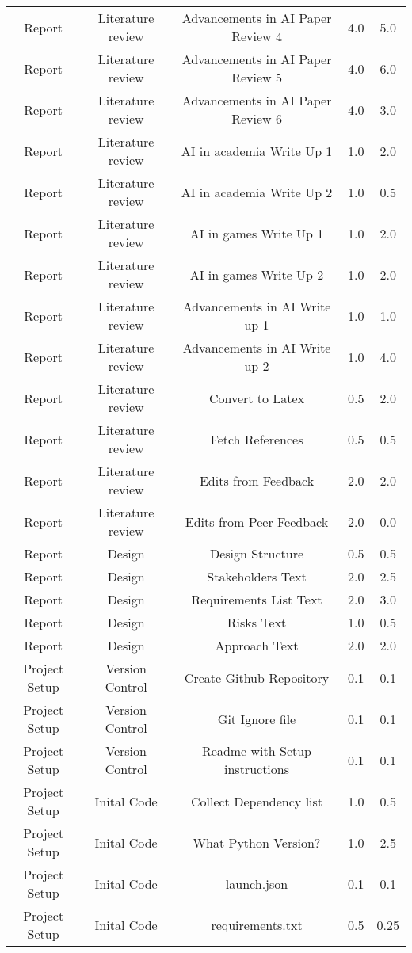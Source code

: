 \begin{longtable}{|c|c|c|c|c|}
	Report & Literature review & Advancements in AI Paper Review 4 & 4.0 & 5.0 \\
	Report & Literature review & Advancements in AI Paper Review 5 & 4.0 & 6.0 \\
	Report & Literature review & Advancements in AI Paper Review 6 & 4.0 & 3.0 \\
	Report & Literature review & AI in academia Write Up 1 & 1.0 & 2.0 \\
	Report & Literature review & AI in academia Write Up 2 & 1.0 & 0.5 \\
	Report & Literature review & AI in games Write Up 1 & 1.0 & 2.0 \\
	Report & Literature review & AI in games Write Up 2 & 1.0 & 2.0 \\
	Report & Literature review & Advancements in AI Write up 1 & 1.0 & 1.0 \\
	Report & Literature review & Advancements in AI Write up 2 & 1.0 & 4.0 \\
	Report & Literature review & Convert to Latex & 0.5 & 2.0 \\
	Report & Literature review & Fetch References & 0.5 & 0.5 \\
	Report & Literature review & Edits from Feedback & 2.0 & 2.0 \\
	Report & Literature review & Edits from Peer Feedback & 2.0 & 0.0 \\
	Report & Design & Design Structure & 0.5 & 0.5 \\
	Report & Design & Stakeholders Text & 2.0 & 2.5 \\
	Report & Design & Requirements List Text & 2.0 & 3.0 \\
	Report & Design & Risks Text & 1.0 & 0.5 \\
	Report & Design & Approach Text & 2.0 & 2.0 \\
	Project Setup & Version Control & Create Github Repository & 0.1 & 0.1 \\
	Project Setup & Version Control & Git Ignore file & 0.1 & 0.1 \\
	Project Setup & Version Control & Readme with Setup instructions & 0.1 & 0.1 \\
	Project Setup & Inital Code & Collect Dependency list & 1.0 & 0.5 \\
	Project Setup & Inital Code & What Python Version? & 1.0 & 2.5 \\
	Project Setup & Inital Code & launch.json & 0.1 & 0.1 \\
	Project Setup & Inital Code & requirements.txt & 0.5 & 0.25 \\

\end{longtable}
